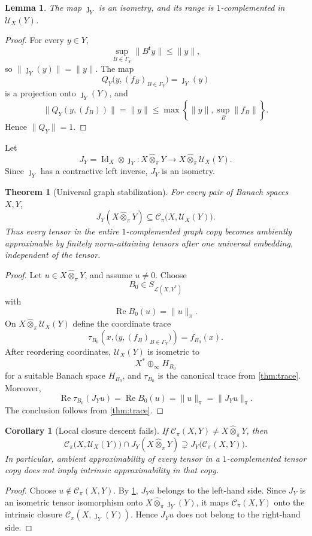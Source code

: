 \documentclass[11pt]{article}
\newtheorem{theorem}{Theorem}[section]
\newtheorem{lemma}[lemma]{Lemma}
\newtheorem{corollary}[corollary]{Corollary}
\theoremstyle{definition}
\theoremstyle{remark}
\newcommand{\whot}{\widehat\otimes_\pi}
\newcommand{\Lin}{\mathcal L}
\newcommand{\Rea}{\operatorname{Re}}
\newcommand{\id}{\operatorname{Id}}
\newcommand{\Cpi}{\mathscr C_\pi}
\newcommand{\U}{\mathcal U}
\begin{document}
\begin{lemma}\label{lem:graph-complemented}
The map $\jmath_Y$ is an isometry, and its range is $1$-complemented in $\U_X(Y)$.
\end{lemma}

\begin{proof}
For every $y\in Y$,
\[
 \sup_{B\in\Gamma_Y}\|B^{\mathsf t}y\|\leq\|y\|,
\]
so $\|\jmath_Y(y)\|=\|y\|$.  The map
\[
 Q_Y\bigl(y,(f_B)_{B\in\Gamma_Y}\bigr)=\jmath_Y(y)
\]
is a projection onto $\jmath_Y(Y)$, and
\[
 \|Q_Y(y,(f_B))\|=\|y\|
 \leq\max\left\{\|y\|,\sup_B\|f_B\|\right\}.
\]
Hence $\|Q_Y\|=1$.
\end{proof}

Let
\[
 J_Y=\id_X\otimes\jmath_Y:X\whot Y\longrightarrow X\whot\U_X(Y).
\]
Since $\jmath_Y$ has a contractive left inverse, $J_Y$ is an isometry.

\begin{theorem}[Universal graph stabilization]\label{thm:universal-graph}
For every pair of Banach spaces $X,Y$,
\[
 J_Y(X\whot Y)\subseteq\Cpi\bigl(X,\U_X(Y)\bigr).
\]
Thus every tensor in the entire $1$-complemented graph copy becomes ambiently approximable by finitely norm-attaining tensors after one universal embedding, independent of the tensor.
\end{theorem}

\begin{proof}
Let $u\in X\whot Y$, and assume $u\neq0$.  Choose
\[
 B_0\in S_{\Lin(X,Y^*)}
\]
with
\[
 \Rea B_0(u)=\|u\|_\pi.
\]
On $X\whot\U_X(Y)$ define the coordinate trace
\[
 \tau_{B_0}\left(x,\bigl(y,(f_B)_{B\in\Gamma_Y}\bigr)\right)
 =f_{B_0}(x).
\]
After reordering coordinates, $\U_X(Y)$ is isometric to
\[
 X^*\oplus_\infty H_{B_0}
\]
for a suitable Banach space $H_{B_0}$, and $\tau_{B_0}$ is the canonical trace from \cref{thm:trace}.  Moreover,
\[
 \Rea\tau_{B_0}(J_Yu)
 =\Rea B_0(u)
 =\|u\|_\pi
 =\|J_Yu\|_\pi.
\]
The conclusion follows from \cref{thm:trace}.
\end{proof}

\begin{corollary}[Local closure descent fails]\label{cor:local-fails}
If $\Cpi(X,Y)\neq X\whot Y$, then
\[
 \Cpi\bigl(X,\U_X(Y)\bigr)
 \cap J_Y(X\whot Y)
 \supsetneq J_Y\bigl(\Cpi(X,Y)\bigr).
\]
In particular, ambient approximability of every tensor in a $1$-complemented tensor copy does not imply intrinsic approximability in that copy.
\end{corollary}

\begin{proof}
Choose $u\notin\Cpi(X,Y)$.  By \cref{thm:universal-graph}, $J_Yu$ belongs to the left-hand side.  Since $J_Y$ is an isometric tensor isomorphism onto $X\whot\jmath_Y(Y)$, it maps $\Cpi(X,Y)$ onto the intrinsic closure $\Cpi(X,\jmath_Y(Y))$.  Hence $J_Yu$ does not belong to the right-hand side.
\end{proof}
\end{document}
